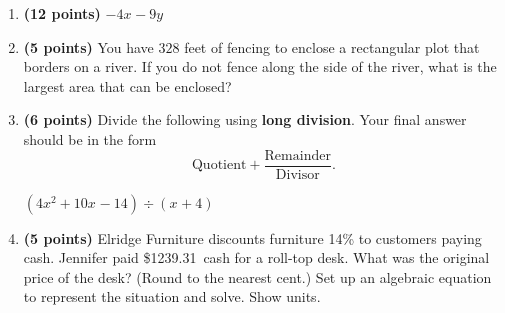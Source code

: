 \documentclass[12pt]{amsart}
\begin{document}
\begin{enumerate}
\vfill 
\def \a{7}\def \atwoone{3}\def \atwotwo{-6}\def \atwothree{5}\def \btwothree{8}\def \sumtwothree{13}\def \diftwothree{-3}\def \bigtwothree{500}\def \powtwothree{32768}\def \logtwothree{0.7739760316291208}\def \factortwothree{119}\def \atwofour{1.89}\def \btwofour{1.679}\def \tooshorttwofour{10.1}\def \moneytwofour{10.10}\def \longertwofour{10.10000}\def \atwofive{0.12}\def \btwofive{0.12346}\def \athreeone{6}\def \bthreeone{5}\def \setthreetwo{[2, 5, 6]}\def \athreetwo{2}\def \bthreetwo{5}\def \cthreetwo{6}\def \controlthreethree{-4}\def \athreethree{2}\def \topthreethree{1}\def \athreefour{3}\def \bthreefour{1}\def \listthreefour{[1, 2, 4, 5]}\def \afourone{16}\def \bfourone{4}\def \fracfourone{4}\def \rootfourtwo{8}\def \simplifiedfourtwo{2 \sqrt{2}}\def \sqrtlistfourtwo{[2, 2]}\def \outfourtwo{2}\def \infourtwo{2}\def \wowfourtwo{1}\def \afourthree{5}\def \nicethreefour{3x^{2}-x^{}+5}\def \nastythreefour{xyz^{3}+5}\def \cfourthree{-4}\def \dfourthree{-9}\def \infourthree{-4x^{}}\def \outfourthree{-9y^{}}\def \afourfour{1600731}\def \nicefourfour{1,600,731}\def \goodfourfour{1,000,000.12345}\def \badfourfour{1,000,000.1}
\item {\bf (12 points)} 
  $\infourthree \outfourthree$ 
\vfill 
\newpage\def \x{82}\def \y{164}\def \L{328}\def \area{13448}
\item {\bf (5 points)} 
 You have $\L$ feet of fencing to enclose a rectangular plot that borders on a river. If you do not fence along the side of the river, what is the largest area that can be enclosed? \\

  
\vfill \vfill \vfill
\def \a{4}\def \b{4}\def \c{-6}\def \r{10}\def \monicpol{x^{}+4}\def \longnbad{4x^{2}+10x^{}-14}\def \anspol{4x^{}-6}
\item {\bf (6 points)} 
 Divide the following using {\bf long division}. Your final answer should be in the form $$ \text{Quotient} + \dfrac{\text{Remainder}}{\text{Divisor}}.$$

\vspace{3mm}

$(\longnbad) \div (\monicpol)$

\vfill  \vfill \vfill
\newpage\def \discount{14}\def \paid{1239.31}\def \rainy{12.31}\def \orcost{1441.06}\def \purcost{1087.11}\def \orrainy{14.31}
\item {\bf (5 points)} 
 Elridge Furniture discounts furniture \discount\% to customers paying cash. Jennifer paid \$\paid\ cash for a roll-top desk. What was the original price of the desk? (Round to the nearest cent.) Set up an algebraic equation to represent the situation and solve. Show units.


\end{enumerate}
\end{document}
